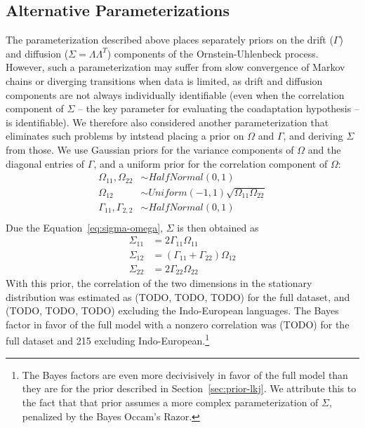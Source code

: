 \documentclass[11pt,a4paper]{article}
\begin{document}
%
%
%

\subsection{Alternative Parameterizations}\label{sec:alt-param}
The parameterization described above places separately priors on the drift ($\Gamma$) and diffusion ($\Sigma = \Lambda\Lambda^T$) components of the Ornstein-Uhlenbeck process.
However, such a parameterization may suffer from slow convergence of Markov chains or diverging transitions when data is limited, as drift and diffusion components are not always individually identifiable (even when the correlation component of $\Sigma$ -- the key parameter for evaluating the coadaptation hypothesis --  is identifiable).
We therefore also considered another parameterization that eliminates such problems by intstead placing a prior on $\Omega$ and $\Gamma$, and deriving $\Sigma$ from those.
We use Gaussian priors for the variance components of $\Omega$ and the diagonal entries of $\Gamma$, and a uniform prior for the correlation component of $\Omega$:
\begin{align*}
\Omega_{11}, \Omega_{22} & \sim HalfNormal(0,1) \\
\Omega_{12} & \sim Uniform(-1,1) \sqrt{\Omega_{11} \Omega_{22}} \\
\Gamma_{11}, \Gamma_{2,2} & \sim HalfNormal(0,1) \\
\end{align*}
Due the Equation~\ref{eq:sigma-omega}, $\Sigma$ is then obtained as
\begin{align*}
	\Sigma_{11} &= 2 \Gamma_{11} \Omega_{11}  \\
	\Sigma_{12} &= (\Gamma_{11} + \Gamma_{22}) \Omega_{12} \\
	\Sigma_{22} &= 2 \Gamma_{22} \Omega_{22}
\end{align*}
With this prior, the correlation of the two dimensions in the stationary distribution was estimated as (TODO, TODO, TODO) for the full dataset, and (TODO, TODO, TODO) excluding the Indo-European languages.
The Bayes factor in favor of the full model with a nonzero correlation was (TODO) for the full dataset and 215 excluding Indo-European.\footnote{The Bayes factors are even more decivisively in favor of the full model than they are for the prior described in Section~\ref{sec:prior-lkj}. We attribute this to the fact that that prior assumes a more complex parameterization of $\Sigma$, penalized by the Bayes Occam's Razor.}
\end{document}
